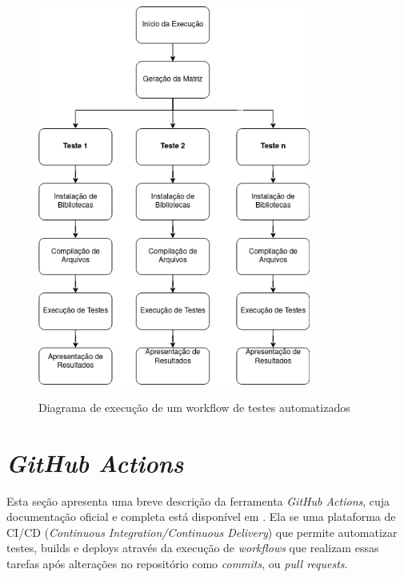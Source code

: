     \begin{figure}[!ht]
        \centering
        \caption{Diagrama de execução de um workflow de testes automatizados}
        \includegraphics[width=0.8\textwidth]{images/Workflow Execution.drawio.png}
        \label{fig:workflow_execution_diagram}
    \end{figure}


\section{\textit{GitHub Actions}}
Esta seção apresenta uma breve descrição da ferramenta \textit{GitHub Actions}, cuja documentação oficial e completa está disponível em \cite{gh-actions}. Ela se uma plataforma de CI/CD (\textit{Continuous Integration/Continuous Delivery}) que permite automatizar testes, builds e deploys através da execução de \textit{workflows} que realizam essas tarefas após alterações no repositório como \textit{commits}, ou \textit{pull requests}.

